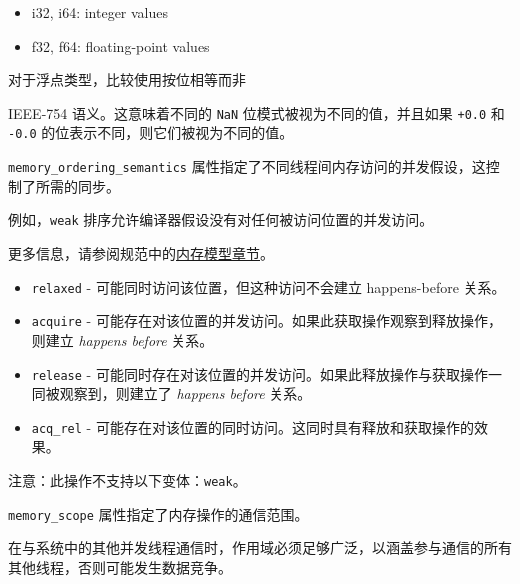 \documentclass{article}
\begin{document}
\begin{itemize}
\item i32, i64: integer values

\item f32, f64: floating-point values





\end{itemize}
对于浮点类型，比较使用按位相等而非

IEEE-754 语义。这意味着不同的 \texttt{NaN} 位模式被视为不同的值，并且如果 \texttt{+0.0} 和 \texttt{-0.0} 的位表示不同，则它们被视为不同的值。



\texttt{memory\_ordering\_semantics} 属性指定了不同线程间内存访问的并发假设，这控制了所需的同步。

例如，\texttt{weak} 排序允许编译器假设没有对任何被访问位置的并发访问。

更多信息，请参阅规范中的\href{https://docs.nvidia.com/cuda/tile-ir/latest/sections/memory_model.html#section-memory-model}{内存模型章节}。



\begin{itemize}
\item \texttt{relaxed} - 可能同时访问该位置，但这种访问不会建立 happens-before 关系。
\item \texttt{acquire} - 可能存在对该位置的并发访问。如果此获取操作观察到释放操作，则建立 \textit{happens before} 关系。
\item \texttt{release} - 可能同时存在对该位置的并发访问。如果此释放操作与获取操作一同被观察到，则建立了 \textit{happens before} 关系。
\item \texttt{acq\_rel} - 可能存在对该位置的同时访问。这同时具有释放和获取操作的效果。


\end{itemize}
注意：此操作不支持以下变体：\texttt{weak}。



\texttt{memory\_scope} 属性指定了内存操作的通信范围。

在与系统中的其他并发线程通信时，作用域必须足够广泛，以涵盖参与通信的所有其他线程，否则可能发生数据竞争。
\end{document}
